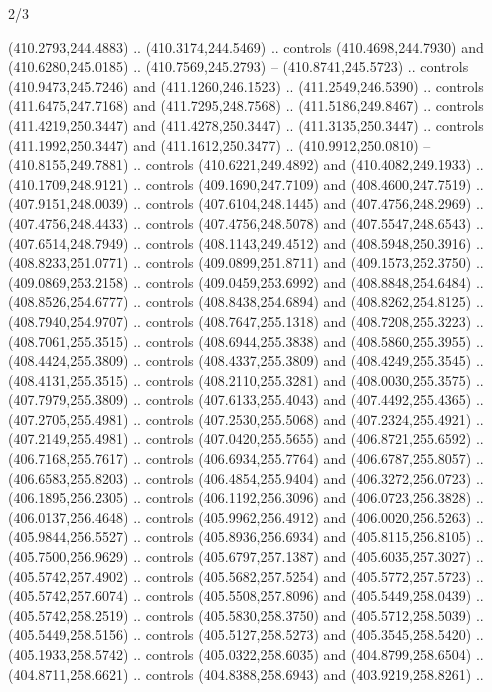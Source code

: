 \begin{flagdescription}{2/3}
\begin{scope}[xshift=0.5\flaglength,yshift=0.5\flagwidth,scale=\flagwidth/495.65]
\begin{scope}[y=0.8pt, x=0.8pt, yscale=-1,shift={(-463.76,-309.78)}]
  (410.2793,244.4883) .. (410.3174,244.5469) .. controls (410.4698,244.7930) and
  (410.6280,245.0185) .. (410.7569,245.2793) -- (410.8741,245.5723) .. controls
  (410.9473,245.7246) and (411.1260,246.1523) .. (411.2549,246.5390) .. controls
  (411.6475,247.7168) and (411.7295,248.7568) .. (411.5186,249.8467) .. controls
  (411.4219,250.3447) and (411.4278,250.3447) .. (411.3135,250.3447) .. controls
  (411.1992,250.3447) and (411.1612,250.3477) .. (410.9912,250.0810) --
  (410.8155,249.7881) .. controls (410.6221,249.4892) and (410.4082,249.1933) ..
  (410.1709,248.9121) .. controls (409.1690,247.7109) and (408.4600,247.7519) ..
  (407.9151,248.0039) .. controls (407.6104,248.1445) and (407.4756,248.2969) ..
  (407.4756,248.4433) .. controls (407.4756,248.5078) and (407.5547,248.6543) ..
  (407.6514,248.7949) .. controls (408.1143,249.4512) and (408.5948,250.3916) ..
  (408.8233,251.0771) .. controls (409.0899,251.8711) and (409.1573,252.3750) ..
  (409.0869,253.2158) .. controls (409.0459,253.6992) and (408.8848,254.6484) ..
  (408.8526,254.6777) .. controls (408.8438,254.6894) and (408.8262,254.8125) ..
  (408.7940,254.9707) .. controls (408.7647,255.1318) and (408.7208,255.3223) ..
  (408.7061,255.3515) .. controls (408.6944,255.3838) and (408.5860,255.3955) ..
  (408.4424,255.3809) .. controls (408.4337,255.3809) and (408.4249,255.3545) ..
  (408.4131,255.3515) .. controls (408.2110,255.3281) and (408.0030,255.3575) ..
  (407.7979,255.3809) .. controls (407.6133,255.4043) and (407.4492,255.4365) ..
  (407.2705,255.4981) .. controls (407.2530,255.5068) and (407.2324,255.4921) ..
  (407.2149,255.4981) .. controls (407.0420,255.5655) and (406.8721,255.6592) ..
  (406.7168,255.7617) .. controls (406.6934,255.7764) and (406.6787,255.8057) ..
  (406.6583,255.8203) .. controls (406.4854,255.9404) and (406.3272,256.0723) ..
  (406.1895,256.2305) .. controls (406.1192,256.3096) and (406.0723,256.3828) ..
  (406.0137,256.4648) .. controls (405.9962,256.4912) and (406.0020,256.5263) ..
  (405.9844,256.5527) .. controls (405.8936,256.6934) and (405.8115,256.8105) ..
  (405.7500,256.9629) .. controls (405.6797,257.1387) and (405.6035,257.3027) ..
  (405.5742,257.4902) .. controls (405.5682,257.5254) and (405.5772,257.5723) ..
  (405.5742,257.6074) .. controls (405.5508,257.8096) and (405.5449,258.0439) ..
  (405.5742,258.2519) .. controls (405.5830,258.3750) and (405.5712,258.5039) ..
  (405.5449,258.5156) .. controls (405.5127,258.5273) and (405.3545,258.5420) ..
  (405.1933,258.5742) .. controls (405.0322,258.6035) and (404.8799,258.6504) ..
  (404.8711,258.6621) .. controls (404.8388,258.6943) and (403.9219,258.8261) ..

\end{scope}
\end{scope}
\end{flagdescription}
